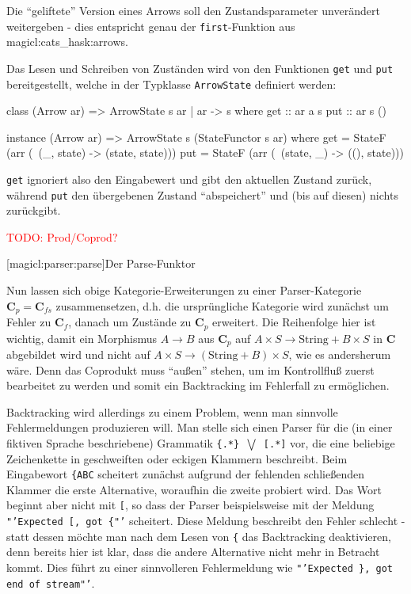 \documentclass[a4paper, bibgerm]{book}
\newcommand\icode[1]{\lstinline?#1?}
\newcommand{\todo}[1]{
  \textcolor{red}{TODO: #1}
}
\newcommand\lsubsection{}
\newcommand\sref{}
\newcommand\ato{\rightarrow} %
\begin{document}
Die "`geliftete"' Version eines Arrows soll den Zustandsparameter
unverändert weitergeben - dies entspricht genau der
\icode{first}-Funktion aus \sref{magicl:cats_hask:arrows}.

Das Lesen und Schreiben von Zuständen wird von den Funktionen \icode{get} und
\icode{put} bereitgestellt, welche in der Typklasse \icode{ArrowState}
definiert werden:

\begin{code}
class (Arrow ar) => ArrowState s ar | ar -> s where
  get :: ar a s
  put :: ar s ()
  
instance (Arrow ar) => ArrowState s (StateFunctor s ar)
  where
    get = StateF (arr (\ (_, state) -> (state, state)))
    put = StateF (arr (\ (state, _) -> ((), state)))
\end{code}

\icode{get} ignoriert also den Eingabewert und gibt den aktuellen
Zustand zurück, während \icode{put} den übergebenen Zustand
"`abspeichert"' und (bis auf diesen) nichts zurückgibt.

\todo{Prod/Coprod?}

\lsubsection[magicl:parser:parse]{Der Parse-Funktor}

Nun lassen sich obige Kategorie-Erweiterungen zu einer Parser-Kategorie
$\mathbf{C}_p = \mathbf{C}_{fs}$ zusammensetzen, d.h. die ursprüngliche
Kategorie wird zunächst um Fehler zu $\mathbf{C}_f$, danach um Zustände
zu $\mathbf{C}_p$ erweitert. Die Reihenfolge hier ist wichtig, damit ein
Morphismus $A \ato B$ aus $\mathbf{C}_p$ auf $A \times S \ato
\mathrm{String} + B \times S$ in $\mathbf{C}$ abgebildet wird und nicht
auf $A \times S \ato (\mathrm{String} + B) \times S$, wie es andersherum
wäre. Denn das Coprodukt muss "`außen"' stehen, um im Kontrollfluß
zuerst bearbeitet zu werden und somit ein Backtracking im Fehlerfall zu
ermöglichen. 

Backtracking wird allerdings zu einem Problem, wenn man sinnvolle
Fehlermeldungen produzieren will. Man stelle sich einen Parser für die
(in einer fiktiven Sprache beschriebene) Grammatik \texttt{\{.*\}
  $\bigvee$ [.*]} vor, die eine beliebige Zeichenkette in geschweiften
oder eckigen Klammern beschreibt. Beim Eingabewort \texttt{\{ABC}
scheitert zunächst aufgrund der fehlenden schließenden Klammer die erste
Alternative, woraufhin die zweite probiert wird. Das Wort beginnt aber
nicht mit \texttt{[}, so dass der Parser beispielsweise mit der Meldung
\texttt{"'Expected [, got \{"'} scheitert. Diese Meldung beschreibt den
Fehler schlecht - statt dessen möchte man nach dem Lesen von \texttt{\{}
das Backtracking deaktivieren, denn bereits hier ist klar, dass die
andere Alternative nicht mehr in Betracht kommt. Dies führt zu einer
sinnvolleren Fehlermeldung wie \texttt{"'Expected \}, got end of
  stream"'}.
\end{document}
